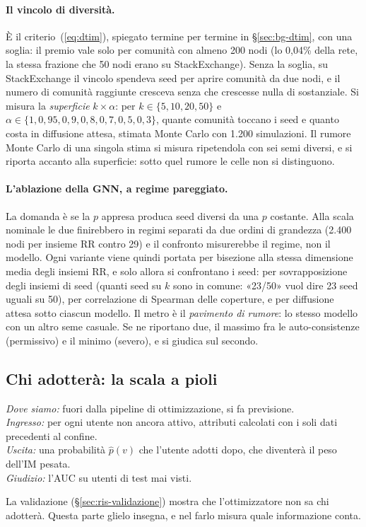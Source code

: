 \documentclass[11pt,a4paper]{article}
\newcommand{\phat}{\hat{p}}
\newcommand{\sx}{StackExchange}
\newcommand{\dovesiamo}[4]{\par\noindent\begingroup\small\color{black!55}
  \textit{Dove siamo:} #1\\
  \textit{Ingresso:} #2\\
  \textit{Uscita:} #3\\
  \textit{Giudizio:} #4\par\endgroup\medskip}
\begin{document}
\paragraph{Il vincolo di diversità.} È il criterio~(\ref{eq:dtim}), spiegato termine per termine in \S\ref{sec:bg-dtim}, con una soglia: il premio vale solo per comunità con almeno 200 nodi (lo 0,04\% della rete, la stessa frazione che 50 nodi erano su \sx{}). Senza la soglia, su \sx{} il vincolo spendeva seed per aprire comunità da due nodi, e il numero di comunità raggiunte cresceva senza che crescesse nulla di sostanziale. Si misura la \emph{superficie} $k \times \alpha$: per $k \in \{5,10,20,50\}$ e $\alpha \in \{1, 0{,}95, 0{,}9, 0{,}8, 0{,}7, 0{,}5, 0{,}3\}$, quante comunità toccano i seed e quanto costa in diffusione attesa, stimata Monte Carlo con 1.200 simulazioni. Il rumore Monte Carlo di una singola stima si misura ripetendola con sei semi diversi, e si riporta accanto alla superficie: sotto quel rumore le celle non si distinguono.

\paragraph{L'ablazione della GNN, a regime pareggiato.} La domanda è se la $p$ appresa produca seed diversi da una $p$ costante. Alla scala nominale le due finirebbero in regimi separati da due ordini di grandezza (2.400 nodi per insieme RR contro 29) e il confronto misurerebbe il regime, non il modello. Ogni variante viene quindi portata per bisezione alla stessa dimensione media degli insiemi RR, e solo allora si confrontano i seed: per sovrapposizione degli insiemi di seed (quanti seed su $k$ sono in comune: «23/50» vuol dire 23 seed uguali su 50), per correlazione di Spearman \citep{spearman1904} delle coperture, e per diffusione attesa sotto ciascun modello. Il metro è il \emph{pavimento di rumore}: lo stesso modello con un altro seme casuale. Se ne riportano due, il massimo fra le auto-consistenze (permissivo) e il minimo (severo), e si giudica sul secondo.

\subsection{Chi adotterà: la scala a pioli}
\label{sec:met-scala}
\dovesiamo{fuori dalla pipeline di ottimizzazione, si fa previsione.}{per ogni utente non ancora attivo, attributi calcolati con i soli dati precedenti al confine.}{una probabilità $\phat(v)$ che l'utente adotti dopo, che diventerà il peso dell'IM pesata.}{l'AUC su utenti di test mai visti.}
La validazione (\S\ref{sec:ris-validazione}) mostra che l'ottimizzatore non sa chi adotterà. Questa parte glielo insegna, e nel farlo misura quale informazione conta.
\end{document}
